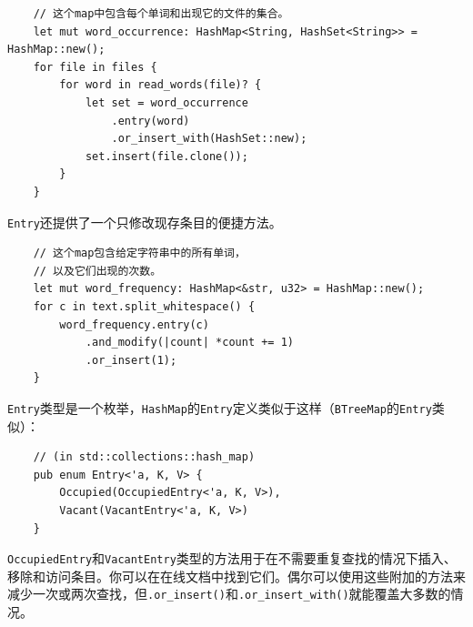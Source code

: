 
\begin{verbatim}
    // 这个map中包含每个单词和出现它的文件的集合。
    let mut word_occurrence: HashMap<String, HashSet<String>> = HashMap::new();
    for file in files {
        for word in read_words(file)? {
            let set = word_occurrence
                .entry(word)
                .or_insert_with(HashSet::new);
            set.insert(file.clone());
        }
    }
\end{verbatim}

\texttt{Entry}还提供了一个只修改现存条目的便捷方法。

\begin{verbatim}
    // 这个map包含给定字符串中的所有单词，
    // 以及它们出现的次数。
    let mut word_frequency: HashMap<&str, u32> = HashMap::new();
    for c in text.split_whitespace() {
        word_frequency.entry(c)
            .and_modify(|count| *count += 1)
            .or_insert(1);
    }
\end{verbatim}

\texttt{Entry}类型是一个枚举，\texttt{HashMap}的\texttt{Entry}定义类似于这样（\texttt{BTreeMap}的\texttt{Entry}类似）：
\begin{verbatim}
    // (in std::collections::hash_map)
    pub enum Entry<'a, K, V> {
        Occupied(OccupiedEntry<'a, K, V>),
        Vacant(VacantEntry<'a, K, V>)
    }
\end{verbatim}

\texttt{OccupiedEntry}和\texttt{VacantEntry}类型的方法用于在不需要重复查找的情况下插入、移除和访问条目。你可以在在线文档中找到它们。偶尔可以使用这些附加的方法来减少一次或两次查找，但\texttt{.or\_insert()}和\texttt{.or\_insert\_with()}就能覆盖大多数的情况。
